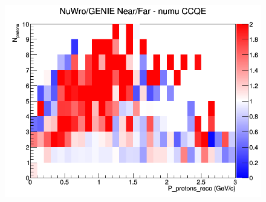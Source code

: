\documentclass[12pt]{article}
\begin{document}
\begin{figure}[h]
\endminipage
{}
\includegraphics[width=\linewidth]{eff_N_P/GAr/protons/ratios/CCQE_NuWro_GENIE_numu_NF_N_P.png}
\endminipage
\newline
\end{figure}
\clearpage
\end{document}
